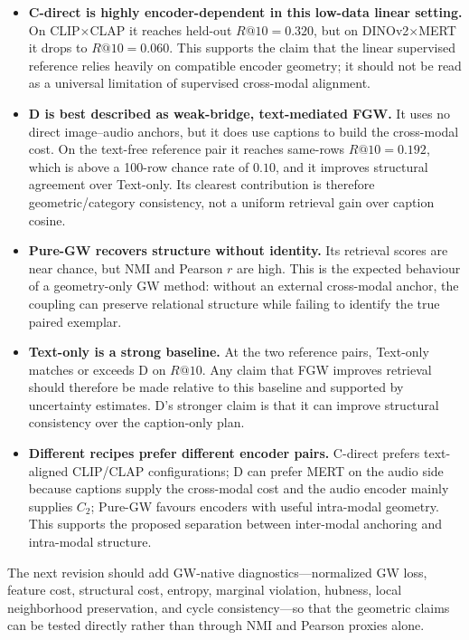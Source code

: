 \begin{itemize}
  \item \textbf{C-direct is highly encoder-dependent in this low-data
  linear setting.} On CLIP$\times$CLAP it reaches held-out
  $R@10=0.320$, but on DINOv2$\times$MERT it drops to $R@10=0.060$.
  This supports the claim that the linear supervised reference relies
  heavily on compatible encoder geometry; it should not be read as a
  universal limitation of supervised cross-modal alignment.

  \item \textbf{D is best described as weak-bridge, text-mediated FGW.}
  It uses no direct image--audio anchors, but it does use captions to
  build the cross-modal cost. On the text-free reference pair it reaches
  same-rows $R@10=0.192$, which is above a 100-row chance rate of
  $0.10$, and it improves structural agreement over Text-only. Its
  clearest contribution is therefore geometric/category consistency,
  not a uniform retrieval gain over caption cosine.

  \item \textbf{Pure-GW recovers structure without identity.} Its
  retrieval scores are near chance, but NMI and Pearson $r$ are high.
  This is the expected behaviour of a geometry-only GW method: without
  an external cross-modal anchor, the coupling can preserve relational
  structure while failing to identify the true paired exemplar.

  \item \textbf{Text-only is a strong baseline.} At the two reference
  pairs, Text-only matches or exceeds D on $R@10$. Any claim that FGW
  improves retrieval should therefore be made relative to this baseline
  and supported by uncertainty estimates. D's stronger claim is that it
  can improve structural consistency over the caption-only plan.

  \item \textbf{Different recipes prefer different encoder pairs.}
  C-direct prefers text-aligned CLIP/CLAP configurations; D can prefer
  MERT on the audio side because captions supply the cross-modal cost
  and the audio encoder mainly supplies $C_2$; Pure-GW favours encoders
  with useful intra-modal geometry. This supports the proposed
  separation between inter-modal anchoring and intra-modal structure.
\end{itemize}

The next revision should add GW-native diagnostics---normalized GW
loss, feature cost, structural cost, entropy, marginal violation,
hubness, local neighborhood preservation, and cycle consistency---so
that the geometric claims can be tested directly rather than through
NMI and Pearson proxies alone.

